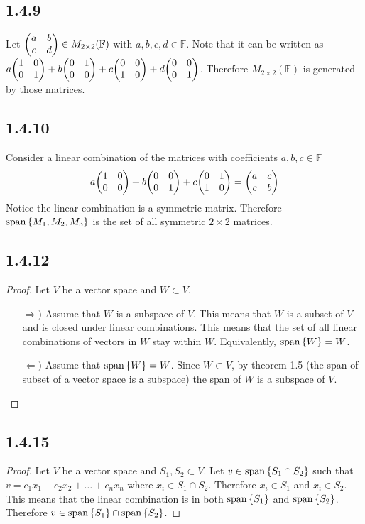 \documentclass[12pt,titlepage]{extarticle}
\begin{document}
\subsection*{1.4.9}
Let $\mqty(a & b \\ c & d) \in M_{2\times 2}(\mathbb{F})$ with $a,b,c,d \in \mathbb{F}$. Note that it can be written as $a \mqty(1 & 0 \\ 0 & 1) + b \mqty(0 & 1 \\ 0 & 0) + c \mqty(0 & 0 \\ 1 & 0) + d \mqty(0 & 0 \\ 0 & 1)$. Therefore $M_{2\times 2}(\mathbb{F})$ is generated by those matrices.

\subsection*{1.4.10}
Consider a linear combination of the matrices with coefficients $a,b,c \in \mathbb{F}$
\[
	a\mqty(1 & 0 \\ 0 & 0) + b\mqty(0 & 0 \\ 0 & 1) + c\mqty(0 & 1 \\ 1 & 0) = \mqty(a & c \\ c & b)
\]
Notice the linear combination is a symmetric matrix. Therefore $\operatorname{span}\qty{M_1, M_2, M_3}$ is the set of all symmetric $2 \times 2$ matrices.

\subsection*{1.4.12}
\begin{proof}
	Let $V$ be a vector space and $W \subset V$.
	\begin{enumerate}
		\item[$\Rightarrow)$]
			Assume that $W$ is a subspace of $V$. This means that $W$ is a subset of $V$ and is closed under linear combinations. This means that the set of all linear combinations of vectors in $W$ stay within $W$. Equivalently, $\operatorname{span}\qty{W} = W$.
		\item[$\Leftarrow)$]
			Assume that $\operatorname{span}\qty{W} = W$. Since $W \subset V$, by theorem 1.5 (the span of subset of a vector space is a subspace) the span of $W$ is a subspace of $V$.
	\end{enumerate}
\end{proof}

\subsection*{1.4.15}
\begin{proof}
	Let $V$ be a vector space and $S_1, S_2 \subset V$. Let $v \in \operatorname{span}\qty{S_1 \cap S_2}$ such that $v = c_1 x_1 + c_2 x_2 + \ldots + c_n x_n$ where $x_i \in S_1 \cap S_2$. Therefore $x_i \in S_1$ and $x_i \in S_2$. This means that the linear combination is in both $\operatorname{span}\qty{S_1}$ and $\operatorname{span}\qty{S_2}$. Therefore $v \in \operatorname{span}\qty{S_1}\cap\operatorname{span}\qty{S_2}$.
\end{proof}
\end{document}
